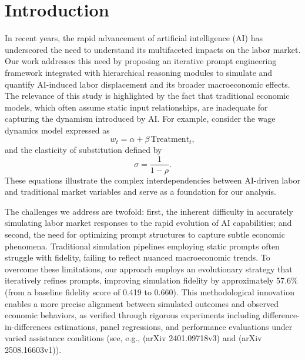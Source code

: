 \documentclass{article}
\begin{document}
\section{Introduction}
In recent years, the rapid advancement of artificial intelligence (AI) has underscored the need to understand its multifaceted impacts on the labor market. Our work addresses this need by proposing an iterative prompt engineering framework integrated with hierarchical reasoning modules to simulate and quantify AI-induced labor displacement and its broader macroeconomic effects. The relevance of this study is highlighted by the fact that traditional economic models, which often assume static input relationships, are inadequate for capturing the dynamism introduced by AI. For example, consider the wage dynamics model expressed as
\[
w_t = \alpha + \beta\,\text{Treatment}_t,
\]
and the elasticity of substitution defined by
\[
\sigma = \frac{1}{1-\rho}.
\]
These equations illustrate the complex interdependencies between AI-driven labor and traditional market variables and serve as a foundation for our analysis.

The challenges we address are twofold: first, the inherent difficulty in accurately simulating labor market responses to the rapid evolution of AI capabilities; and second, the need for optimizing prompt structures to capture subtle economic phenomena. Traditional simulation pipelines employing static prompts often struggle with fidelity, failing to reflect nuanced macroeconomic trends. To overcome these limitations, our approach employs an evolutionary strategy that iteratively refines prompts, improving simulation fidelity by approximately 57.6\% (from a baseline fidelity score of 0.419 to 0.660). This methodological innovation enables a more precise alignment between simulated outcomes and observed economic behaviors, as verified through rigorous experiments including difference-in-differences estimations, panel regressions, and performance evaluations under varied assistance conditions (see, e.g., (arXiv 2401.09718v3) and (arXiv 2508.16603v1)).
\end{document}

